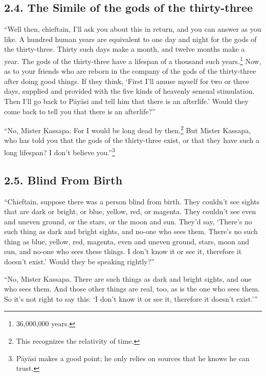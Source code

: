 \documentclass[12pt,openany]{book}%
\begin{document}
\subsection*{2.4. The Simile of the gods of the thirty-three }

“Well then, chieftain, I’ll ask you about this in return, and you can answer as you like. A hundred human years are equivalent to one day and night for the gods of the thirty-three. Thirty such days make a month, and twelve months make a year. The gods of the thirty-three have a lifespan of a thousand such years.\footnote{36,000,000 years. } Now, as to your friends who are reborn in the company of the gods of the thirty-three after doing good things. If they think, ‘First I’ll amuse myself for two or three days, supplied and provided with the five kinds of heavenly sensual stimulation. Then I’ll go back to \textsanskrit{Pāyāsi} and tell him that there is an afterlife.’ Would they come back to tell you that there is an afterlife?” 

“No, Mister Kassapa. For I would be long dead by then.\footnote{This recognizes the relativity of time. } But Mister Kassapa, who has told you that the gods of the thirty-three exist, or that they have such a long lifespan? I don’t believe you.”\footnote{\textsanskrit{Pāyāsi} makes a good point; he only relies on sources that he knows he can trust. } 

\subsection*{2.5. Blind From Birth }

“Chieftain, suppose there was a person blind from birth. They couldn’t see sights that are dark or bright, or blue, yellow, red, or magenta. They couldn’t see even and uneven ground, or the stars, or the moon and sun. They’d say, ‘There’s no such thing as dark and bright sights, and no-one who sees them. There’s no such thing as blue, yellow, red, magenta, even and uneven ground, stars, moon and sun, and no-one who sees these things. I don’t know it or see it, therefore it doesn’t exist.’ Would they be speaking rightly?” 

“No, Mister Kassapa. There are such things as dark and bright sights, and one who sees them. And those other things are real, too, as is the one who sees them. So it’s not right to say this: ‘I don’t know it or see it, therefore it doesn’t exist.’” 
\end{document}
